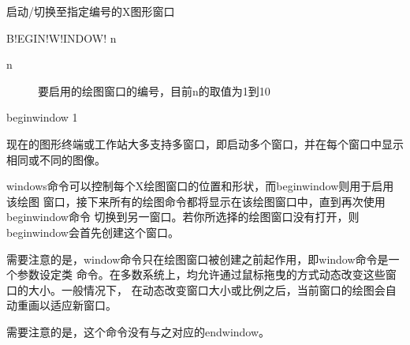 \label{cmd:beginwindow}

启动/切换至指定编号的X图形窗口

\begin{SACSTX}
B!EGIN!W!INDOW! n
\end{SACSTX}

\begin{description}
\item [n] 要启用的绘图窗口的编号，目前n的取值为1到10
\end{description}

\begin{SACDFT}
beginwindow 1
\end{SACDFT}

现在的图形终端或工作站大多支持多窗口，即启动多个窗口，并在每个窗口中显示相同或不同的图像。

windows命令可以控制每个X绘图窗口的位置和形状，而beginwindow则用于启用该绘图
窗口，接下来所有的绘图命令都将显示在该绘图窗口中，直到再次使用beginwindow命令
切换到另一窗口。若你所选择的绘图窗口没有打开，则beginwindow会首先创建这个窗口。

需要注意的是，window命令只在绘图窗口被创建之前起作用，即window命令是一个参数设定类
命令。在多数系统上，均允许通过鼠标拖曳的方式动态改变这些窗口的大小。一般情况下，
在动态改变窗口大小或比例之后，当前窗口的绘图会自动重画以适应新窗口。

需要注意的是，这个命令没有与之对应的endwindow。

